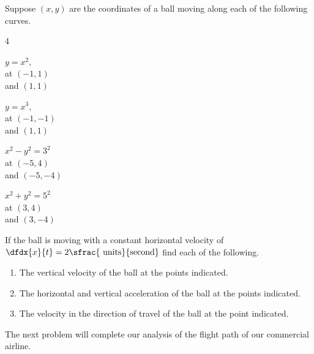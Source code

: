 \pagebreak[4]
\begin{ProficiencyDrill}
  Suppose  $(x,y)$ are  the coordinates of a ball moving
  along each of the following curves.
    \begin{enumerate}[label={\bf{}(\Roman*)}]
    \begin{multicols}{4}
    \item $y=x^2,$\\ at $(-1,1)$\\ and $(1,1)$
    \item $y=x^3,$\\ at $(-1,-1)$\\ and $(1,1)$
    \item $x^2-y^2=3^2$\\ at $(-5,4)$\\ and $(-5,-4)$
    \item $x^2+y^2=5^2$\\ at $(3,4)$\\ and $(3,-4)$
    \end{multicols}
  \end{enumerate}
If the ball is moving with a constant
  horizontal velocity of
  $\dfdx{x}{t}=2\sfrac{\text{ units}}{\text{second}}$ find each of
  the following.
  \begin{enumerate}[label={\bf{}(\alph*)}]
  \item The vertical velocity of the ball at the points indicated.
  \item The horizontal and vertical acceleration of the ball at  the points
    indicated.
  \item The velocity in the direction of travel of the ball at
    the point indicated.
  \end{enumerate}
\end{ProficiencyDrill}

 The next problem will complete our analysis of the flight path
 of our commercial airline.

